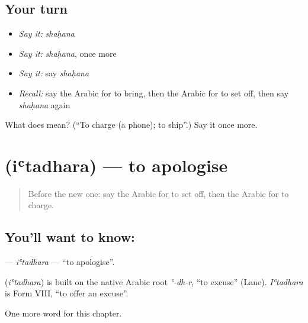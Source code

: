 \subsection*{Your turn}
\begin{itemize}
\raggedright
  \item \emph{Say it:} \emph{shaḥana}
  \item \emph{Say it:} \emph{shaḥana}, once more
  \item \emph{Say it:} say \emph{shaḥana}
  \item \emph{Recall:} say the Arabic for to bring, then the Arabic for to set off, then say \emph{shaḥana} again
\end{itemize}

\begin{tcolorbox}[breakable,colback=teal!4,colframe=teal!35!black,title={Before you move on}]
What does  mean? (\textquotedblleft{}To charge (a phone); to ship\textquotedblright{}.) Say it once more.
\end{tcolorbox}
\section[\texorpdfstring{\ar{اعتذر} (iʿtadhara)}{اعتذر (iʿtadhara)}]{ (iʿtadhara) — to apologise}

\label{lesson:AR-C226-itadhara}



\begin{quote}
Before the new one: say the Arabic for to set off, then the Arabic for to charge.
\end{quote}

\subsection*{You'll want to know: }
\textbf{} — \emph{iʿtadhara} — \textquotedblleft{}to apologise\textquotedblright{}.

\begin{cousinweb}
\textbf{} (\emph{iʿtadhara}) is built on the native Arabic root \emph{ʿ-dh-r}, \textquotedblleft{}to excuse\textquotedblright{} (Lane). \emph{Iʿtadhara} is Form VIII, \textquotedblleft{}to offer an excuse\textquotedblright{}.
\end{cousinweb}

\begin{grammarlens}[title={What you've built}]
One more word for this chapter.
\end{grammarlens}

